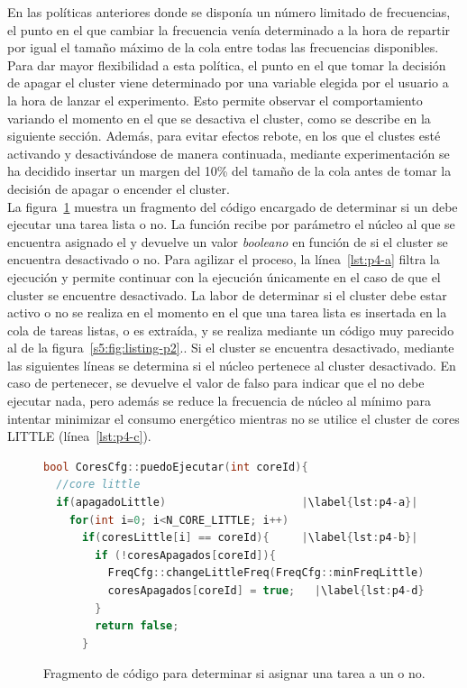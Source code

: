 En las políticas anteriores donde se disponía un número limitado de
frecuencias, el punto en el que cambiar la frecuencia venía determinado a
la hora de repartir por igual el tamaño máximo de la cola entre todas las
frecuencias disponibles. Para dar mayor flexibilidad a esta política, el
punto en el que tomar la decisión de apagar el cluster viene determinado
por una variable elegida por el usuario a la hora de lanzar el
experimento. Esto permite observar el comportamiento variando el momento en
el que se desactiva el cluster, como se describe en la siguiente
sección. Además, para evitar efectos rebote, en los que el clustes esté
activando y desactivándose de manera continuada, mediante experimentación
se ha decidido insertar un margen del 10\% del tamaño de la cola antes de
tomar la decisión de apagar o encender el cluster.\\

La figura~\ref{fig:P4-puedo-ejecutar} muestra un fragmento del código
encargado de determinar si un \wt debe ejecutar una tarea lista o no. La
función recibe por parámetro el núcleo al que se encuentra asignado el \wt
y devuelve un valor \emph{booleano} en función de si el cluster se
encuentra desactivado o no. Para agilizar el proceso, la
línea~\ref{lst:p4-a} filtra la ejecución y permite continuar con la
ejecución únicamente en el caso de que el cluster se encuentre
desactivado. La labor de determinar si el cluster debe estar activo o no se
realiza en el momento en el que una tarea lista es insertada en la cola de
tareas listas, o es extraída, y se realiza mediante un código muy parecido
al de la figura~\ref{s5:fig:listing-p2}.. Si el cluster se encuentra desactivado, mediante las siguientes
líneas se determina si el núcleo pertenece al cluster desactivado. En caso
de pertenecer, se devuelve el valor de falso para indicar que el \wt no
debe ejecutar nada, pero además se reduce la frecuencia de núcleo al mínimo
para intentar minimizar el consumo energético mientras no se utilice el
cluster de cores LITTLE (línea~\ref{lst:p4-c}).


\begin{figure}
  \centering
\begin{lstlisting}[language=C++]
bool CoresCfg::puedoEjecutar(int coreId){
  //core little
  if(apagadoLittle)                     |\label{lst:p4-a}|
    for(int i=0; i<N_CORE_LITTLE; i++)
      if(coresLittle[i] == coreId){     |\label{lst:p4-b}|
        if (!coresApagados[coreId]){
          FreqCfg::changeLittleFreq(FreqCfg::minFreqLittle); |\label{lst:p4-c}|
          coresApagados[coreId] = true;   |\label{lst:p4-d}|
        }
        return false;
      }
\end{lstlisting}
  \caption{Fragmento de código para determinar si asignar una tarea a un
    \wt o no.}
  \label{fig:P4-puedo-ejecutar}
\end{figure}

